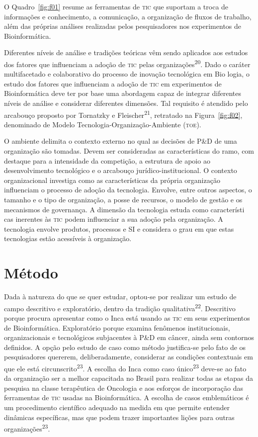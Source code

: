 \documentclass{article}
\begin{document}
O Quadro~\ref{fig:f01}
resume as ferramentas de \textsc{tic} que suportam a troca de informações e conhecimento,
a comunicação, a organização de fluxos de trabalho, além das próprias análises
realizadas pelos pesquisadores nos experimentos de Bioinformática.

Diferentes níveis de análise e tradições teóricas vêm sendo aplicados aos
estudos dos fatores que influenciam a adoção de \textsc{tic} pelas
organizações\textsuperscript{20}. Dado o caráter multifacetado e colaborativo do processo de inovação
tecnológica em Bio logia, o estudo dos fatores que influenciam a adoção de \textsc{tic}
em experimentos de Bioinformática deve ter por base uma abordagem capaz de
integrar diferentes níveis de análise e considerar diferentes dimensões. Tal
requisito é atendido pelo arcabouço proposto por Tornatzky e
Fleischer\textsuperscript{21}, retratado na Figura~\ref{fig:f02}, denominado de Modelo Tecnologia-Organização-Ambiente (\textsc{toe}).

O ambiente delimita o contexto externo no qual as decisões de P\&D de uma
organização são tomadas. Devem ser consideradas as características do ramo, com
destaque para a intensidade da competição, a estrutura de apoio ao
desenvolvimento tecnológico e o arcabouço jurídico-institucional. O contexto
organizacional investiga como as características da própria organização
influenciam o processo de adoção da tecnologia. Envolve, entre outros aspectos,
o tamanho e o tipo de organização, a posse de recursos, o modelo de gestão e os
mecanismos de governança. A dimensão da tecnologia estuda como característi cas
inerentes às \textsc{tic} podem influenciar a sua adoção pela organização. A tecnologia
envolve produtos, processos e SI e considera o grau em que estas tecnologias
estão acessíveis à organização.

\section{Método}

Dada à natureza do que se quer estudar, optou-se por realizar um estudo de campo
descritivo e exploratório, dentro da tradição qualitativa\textsuperscript{22}. Descritivo porque procura apresentar como o Inca está usando as \textsc{tic} em seus
experimentos de Bioinformática. Exploratório porque examina fenômenos
institucionais, organizacionais e tecnológicos subjacentes à P\&D em câncer,
ainda sem contornos definidos. A opção pelo estudo de caso como método
justifica-se pelo fato de os pesquisadores quererem, deliberadamente, considerar
as condições contextuais em que ele está circunscrito\textsuperscript{23}. A escolha do Inca como caso único\textsuperscript{23}
deve-se ao fato da organização ser a melhor capacitada no Brasil para realizar
todas as etapas da pesquisa na classe terapêutica de Oncologia e aos esforços de
incorporação das ferramentas de \textsc{tic} usadas na Bioinformática. A escolha de casos
emblemáticos é um procedimento científico adequado na medida em que permite
entender dinâmicas específicas, mas que podem trazer importantes lições para
outras organizações\textsuperscript{23}.
\end{document}
